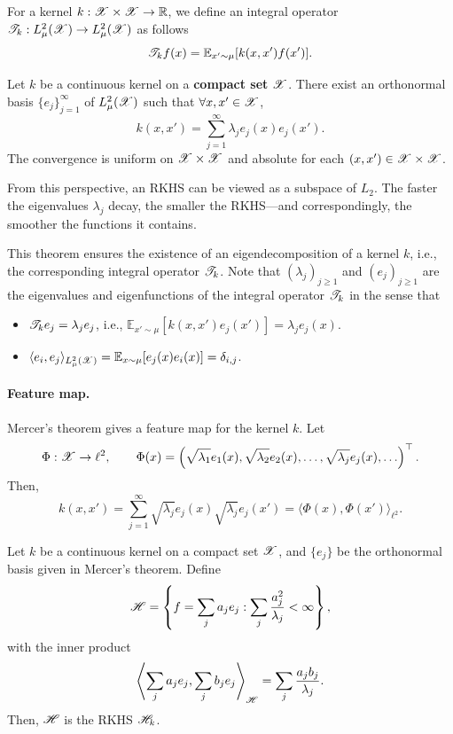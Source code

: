 For a kernel $k : \mathcal{X} \times \mathcal{X} \to \mathbb{R}$, we define an integral operator $\mathcal{T}_k : L^2_\mu(\mathcal{X}) \to L^2_\mu(\mathcal{X})$ as follows
\[
\mathcal{T}_k f(x) = \mathbb{E}_{x' \sim \mu}[k(x, x') f(x')].
\]

\begin{thm}
Let $k$ be a continuous kernel on a \textbf{compact set} $\mathcal{X}$. There exist an orthonormal basis $\{e_j\}_{j=1}^\infty$ of $L^2_\mu(\mathcal{X})$ such that $\forall x, x' \in \mathcal{X}$,
\[
k(x, x') = \sum_{j=1}^{\infty} \lambda_j e_j(x) e_j(x').
\]
The convergence is uniform on $\mathcal{X} \times \mathcal{X}$ and absolute for each $(x, x') \in \mathcal{X} \times \mathcal{X}$.
\end{thm}
\begin{rem}
    From this perspective, an RKHS can be viewed as a subspace of $L_2$. The faster the eigenvalues $\lambda_j$ decay, the smaller the RKHS---and correspondingly, the smoother the functions it contains.
\end{rem}

This theorem ensures the existence of an eigendecomposition of a kernel $k$, i.e., the corresponding integral operator $\mathcal{T}_k$. Note that $(\lambda_j)_{j \geq 1}$ and $(e_j)_{j \geq 1}$ are the eigenvalues and eigenfunctions of the integral operator $\mathcal{T}_k$ in the sense that
\begin{itemize}
    \item $\mathcal{T}_k e_j = \lambda_j e_j$, i.e., $\mathbb{E}_{x' \sim \mu}[k(x, x') e_j(x')] = \lambda_j e_j(x)$.
    \item $\langle e_i, e_j \rangle_{L^2_\mu(\mathcal{X})} = \mathbb{E}_{x \sim \mu}[e_j(x) e_i(x)] = \delta_{i,j}$.
\end{itemize}

\paragraph{Feature map.} Mercer's theorem gives a feature map for the kernel $k$. Let
\[
\Phi : \mathcal{X} \to \ell^2, \qquad \Phi(x) = \left(\sqrt{\lambda_1} e_1(x), \sqrt{\lambda_2} e_2(x), \ldots, \sqrt{\lambda_j} e_j(x), \ldots\right)^\top.
\]
Then,
\[
k(x, x') = \sum_{j=1}^{\infty} \sqrt{\lambda_j} e_j(x) \sqrt{\lambda_j} e_j(x') = \langle \Phi(x), \Phi(x') \rangle_{\ell^2}.
\]

\begin{thm}
Let $k$ be a continuous kernel on a compact set $\mathcal{X}$, and $\{e_j\}$ be the orthonormal basis given in Mercer's theorem. Define
\[
\mathcal{H} = \left\{ f = \sum_j a_j e_j : \sum_j \frac{a_j^2}{\lambda_j} < \infty \right\},
\]
with the inner product
\[
\left\langle \sum_j a_j e_j, \sum_j b_j e_j \right\rangle_{\mathcal{H}} = \sum_j \frac{a_j b_j}{\lambda_j}.
\]
Then, $\mathcal{H}$ is the RKHS $\mathcal{H}_k$.
\end{thm}

